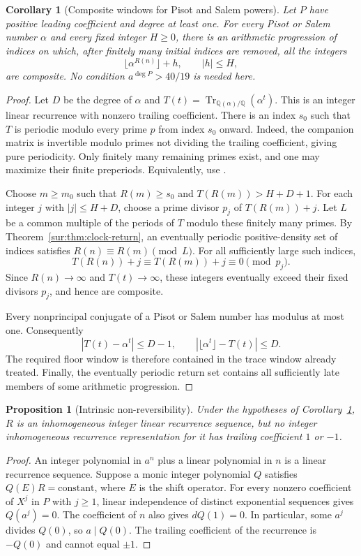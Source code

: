 \documentclass[11pt,a4paper]{article}
\newtheorem{proposition}[theorem]{Proposition}
\newtheorem{corollary}[theorem]{Corollary}
\theoremstyle{definition}
\theoremstyle{remark}
\numberwithin{equation}{section}
\begin{document}
\begin{corollary}[Composite windows for Pisot and Salem powers]
\label{sur:cor:clock-windows}
Let $P$ have positive leading coefficient and degree at least one.
For every Pisot or Salem number $\alpha$ and every fixed integer
$H\ge0$, there is an arithmetic progression of indices on which,
after finitely many initial indices are removed, all the integers
\[
 \lfloor\alpha^{R(n)}\rfloor+h,\qquad |h|\le H,
\]
are composite. No condition $a^{\deg P}>40/19$ is needed here.
\end{corollary}
\begin{proof}
Let $D$ be the degree of $\alpha$ and
$T(t)=\operatorname{Tr}_{\mathbb Q(\alpha)/\mathbb Q}(\alpha^t)$.
This is an integer linear recurrence with nonzero trailing coefficient.
There is an index $s_0$ such that $T$ is periodic modulo every prime
$p$ from index $s_0$ onward. Indeed, the companion matrix is invertible
modulo primes not dividing the trailing coefficient, giving pure
periodicity. Only finitely many remaining primes exist, and one may
maximize their finite preperiods. Equivalently, use
\cite[Lemma~2.1(b)]{SaitoIntervals}.

Choose $m\ge m_0$ such that $R(m)\ge s_0$ and
$T(R(m))>H+D+1$. For each integer $j$ with $|j|\le H+D$, choose a
prime divisor $p_j$ of $T(R(m))+j$. Let $L$ be a common multiple of the
periods of $T$ modulo these finitely many primes. By
Theorem~\ref{sur:thm:clock-return}, an eventually periodic positive-density
set of indices satisfies $R(n)\equiv R(m)\pmod L$. For all sufficiently
large such indices,
\[
 T(R(n))+j\equiv T(R(m))+j\equiv0\pmod{p_j}.
\]
Since $R(n)\to\infty$ and $T(t)\to\infty$, these integers eventually
exceed their fixed divisors $p_j$, and hence are composite.

Every nonprincipal conjugate of a Pisot or Salem number has modulus
at most one. Consequently
\[
 |T(t)-\alpha^t|\le D-1,
 \qquad |\lfloor\alpha^t\rfloor-T(t)|\le D.
\]
The required floor window is therefore contained in the trace window
already treated. Finally, the eventually periodic return set contains
all sufficiently late members of some arithmetic progression.
\end{proof}

\begin{proposition}[Intrinsic non-reversibility]\label{sur:prop:clock-nonrev}
Under the hypotheses of Corollary~\ref{sur:cor:clock-windows}, $R$ is an
inhomogeneous integer linear recurrence sequence, but no integer
inhomogeneous recurrence representation for it has trailing coefficient
$1$ or $-1$.
\end{proposition}
\begin{proof}
An integer polynomial in $a^n$ plus a linear polynomial in $n$ is a
linear recurrence sequence. Suppose a monic integer polynomial $Q$
satisfies $Q(E)R=\text{constant}$, where $E$ is the shift operator.
For every nonzero coefficient of $X^j$ in $P$ with $j\ge1$, linear
independence of distinct exponential sequences gives $Q(a^j)=0$.
The coefficient of $n$ also gives $dQ(1)=0$. In particular, some
$a^j$ divides $Q(0)$, so $a\mid Q(0)$. The trailing coefficient of the
recurrence is $-Q(0)$ and cannot equal $\pm1$.
\end{proof}
\end{document}
